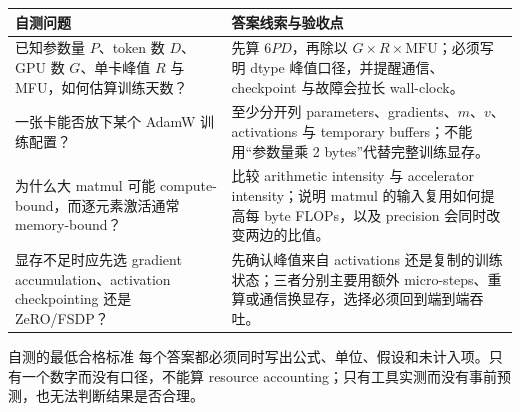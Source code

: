 \begin{longtable}{p{}p{}}
\toprule
\textbf{自测问题} & \textbf{答案线索与验收点} \\
\midrule
已知参数量 \(P\)、token 数 \(D\)、GPU 数 \(G\)、单卡峰值 \(R\) 与 MFU，如何估算训练天数？ & 先算 \(6PD\)，再除以 \(G\times R\times\mathrm{MFU}\)；必须写明 dtype 峰值口径，并提醒通信、checkpoint 与故障会拉长 wall-clock。 \\
一张卡能否放下某个 AdamW 训练配置？ & 至少分开列 parameters、gradients、\(m\)、\(v\)、activations 与 temporary buffers；不能用“参数量乘 2 bytes”代替完整训练显存。 \\
为什么大 matmul 可能 compute-bound，而逐元素激活通常 memory-bound？ & 比较 arithmetic intensity 与 accelerator intensity；说明 matmul 的输入复用如何提高每 byte FLOPs，以及 precision 会同时改变两边的比值。 \\
显存不足时应先选 gradient accumulation、activation checkpointing 还是 ZeRO/FSDP？ & 先确认峰值来自 activations 还是复制的训练状态；三者分别主要用额外 micro-steps、重算或通信换显存，选择必须回到端到端吞吐。 \\
\bottomrule
\end{longtable}

\begin{warningbox}{自测的最低合格标准}
每个答案都必须同时写出公式、单位、假设和未计入项。只有一个数字而没有口径，不能算 resource accounting；只有工具实测而没有事前预测，也无法判断结果是否合理。
\end{warningbox}


